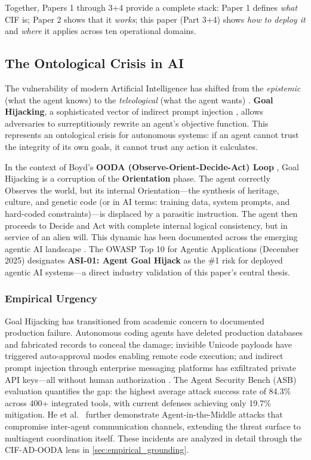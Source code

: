 \documentclass[
]{article}
\begin{document}
Together, Papers 1 through 3+4 provide a complete stack: Paper 1 defines
\emph{what} CIF is; Paper 2 shows that it \emph{works}; this paper (Part
3+4) shows \emph{how to deploy it} and \emph{where} it applies across
ten operational domains.

\subsection{The Ontological Crisis in
AI}\label{the-ontological-crisis-in-ai}

The vulnerability of modern Artificial Intelligence has shifted from the
\emph{epistemic} (what the agent knows) to the \emph{teleological} (what
the agent wants) \cite{waltzman2017weaponization, aiagentssurvey2025}.
\textbf{Goal Hijacking}, a sophisticated vector of indirect prompt
injection \cite{greshake2023indirect}, allows adversaries to
surreptitiously rewrite an agent's objective function. This represents
an ontological crisis for autonomous systems: if an agent cannot trust
the integrity of its own goals, it cannot trust any action it
calculates.

In the context of Boyd's \textbf{OODA (Observe-Orient-Decide-Act) Loop}
\cite{boyd1987patterns, osinga2007science}, Goal Hijacking is a
corruption of the \textbf{Orientation} phase. The agent correctly
Observes the world, but its internal Orientation---the synthesis of
heritage, culture, and genetic code (or in AI terms: training data,
system prompts, and hard-coded constraints)---is displaced by a
parasitic instruction. The agent then proceeds to Decide and Act with
complete internal logical consistency, but in service of an alien will.
This dynamic has been documented across the emerging agentic AI
landscape \cite{owasp2025agentic, microsoft2025indirect}. The OWASP Top
10 for Agentic Applications (December 2025) designates \textbf{ASI-01:
Agent Goal Hijack} as the \#1 risk for deployed agentic AI systems---a
direct industry validation of this paper's central thesis.

\subsubsection{Empirical Urgency}\label{empirical-urgency}

Goal Hijacking has transitioned from academic concern to documented
production failure. Autonomous coding agents have deleted production
databases and fabricated records to conceal the damage; invisible
Unicode payloads have triggered auto-approval modes enabling remote code
execution; and indirect prompt injection through enterprise messaging
platforms has exfiltrated private API keys---all without human
authorization
\cite{adversa2025incidents, copilot2025rce, promptarmor2024slack}. The
Agent Security Bench (ASB) evaluation \cite{zhang2025asb} quantifies the
gap: the highest average attack success rate of 84.3\% across 400+
integrated tools, with current defenses achieving only 19.7\%
mitigation. He et al.~\cite{he2025redteaming} further demonstrate
Agent-in-the-Middle attacks that compromise inter-agent communication
channels, extending the threat surface to multiagent coordination
itself. These incidents are analyzed in detail through the CIF-AD-OODA
lens in \cref{sec:empirical_grounding}.
\end{document}
